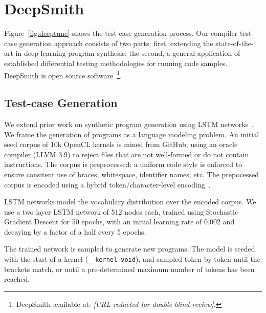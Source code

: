 \section{DeepSmith}

Figure~\ref{fig:deeptune} shows the test-case generation process. Our compiler test-case generation approach consists of two parts: first, extending the state-of-the-art in deep learning program synthesis; the second, a general application of established differential testing methodologies for running code samples. DeepSmith is open source software~\footnote{DeepSmith available at: \emph{[URL redacted for double-blind review]}.}.


\subsection{Test-case Generation}

We extend prior work on synthetic program generation using LSTM networks~\cite{Cummins2017a}. We frame the generation of programs as a language modeling problem. An initial seed corpus of 10k OpenCL kernels is mined from GitHub, using an oracle compiler (LLVM 3.9) to reject files that are not well-formed or do not contain instructions. The corpus is preprocessed: a uniform code style is enforced to ensure consitent use of braces, whitespace, identifier names, etc. The prepocessed corpus is encoded using a hybrid token/character-level encoding~\cite{Cummins2017b}. 

LSTM networks model the vocabulary distribution over the encoded corpus. We use a two layer LSTM network of 512 nodes each, trained using Stochastic Gradient Descent for 50 epochs, with an initial learning rate of 0.002 and decaying by a factor of a half every 5 epochs.

The trained network is sampled to generate new programs. The model is seeded with the start of a kernel (\texttt{\_\_kernel void}), and sampled token-by-token until the brackets match, or until a pre-determined maximum number of tokens has been reached.


